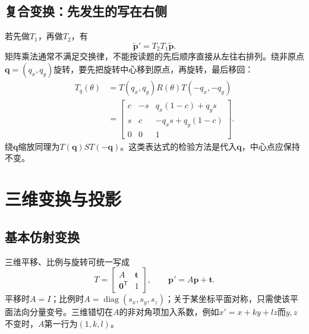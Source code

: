 \subsection{复合变换：先发生的写在右侧}
若先做$T_1$，再做$T_2$，有
\[
\widetilde{\boldsymbol p}'=T_2T_1\widetilde{\boldsymbol p}.
\]
矩阵乘法通常不满足交换律，不能按读题的先后顺序直接从左往右排列。绕非原点$\boldsymbol q=(q_x,q_y)$旋转，要先把旋转中心移到原点，再旋转，最后移回：
\begin{align*}
T_q(\theta)&=T(q_x,q_y)R(\theta)T(-q_x,-q_y)\\
&=\begin{bmatrix}
c&-s&q_x(1-c)+q_ys\\
s&c&-q_xs+q_y(1-c)\\
0&0&1
\end{bmatrix}.
\end{align*}
绕$\boldsymbol q$缩放同理为$T(\boldsymbol q)S T(-\boldsymbol q)$。这类表达式的检验方法是代入$\boldsymbol q$，中心点应保持不变。


\section{三维变换与投影}
\subsection{基本仿射变换}
三维平移、比例与旋转可统一写成
\[
T=\begin{bmatrix}A&\boldsymbol t\\\boldsymbol0^{\mathsf T}&1\end{bmatrix},\qquad
\boldsymbol p'=A\boldsymbol p+\boldsymbol t.
\]
平移时$A=I$；比例时$A=\operatorname{diag}(s_x,s_y,s_z)$；关于某坐标平面对称，只需使该平面法向分量变号。三维错切在$A$的非对角项加入系数，例如$x'=x+ky+lz$而$y,z$不变时，$A$第一行为$(1,k,l)$。

